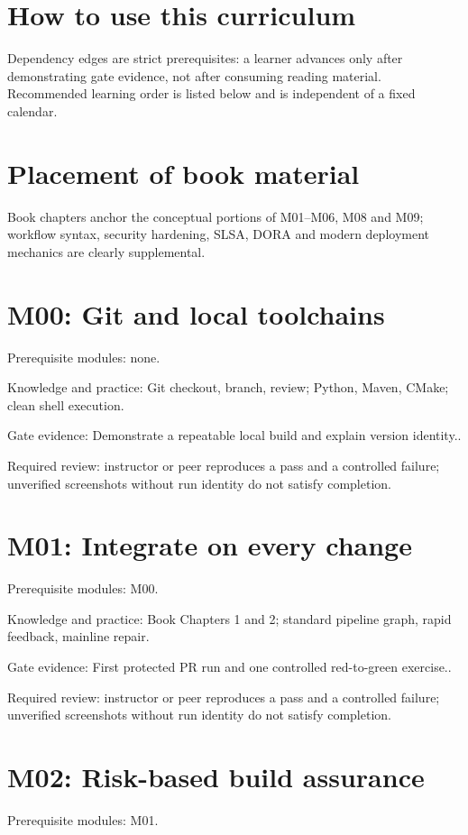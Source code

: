 \documentclass[11pt,letterpaper]{article}
\begin{document}
\makedoctitle
\makedocsummary
\tableofcontents
\clearpage
\section{How to use this curriculum}
Dependency edges are strict prerequisites: a learner advances only after demonstrating gate evidence, not after consuming reading material. Recommended learning order is listed below and is independent of a fixed calendar.

\section{Placement of book material}
Book chapters anchor the conceptual portions of M01--M06, M08 and M09; workflow syntax, security hardening, SLSA, DORA and modern deployment mechanics are clearly supplemental.

\section{M00: Git and local toolchains}
Prerequisite modules: none.

Knowledge and practice: Git checkout, branch, review; Python, Maven, CMake; clean shell execution.

Gate evidence: Demonstrate a repeatable local build and explain version identity..

Required review: instructor or peer reproduces a pass and a controlled failure; unverified screenshots without run identity do not satisfy completion.

\section{M01: Integrate on every change}
Prerequisite modules: M00.

Knowledge and practice: Book Chapters 1 and 2; standard pipeline graph, rapid feedback, mainline repair.

Gate evidence: First protected PR run and one controlled red-to-green exercise..

Required review: instructor or peer reproduces a pass and a controlled failure; unverified screenshots without run identity do not satisfy completion.

\section{M02: Risk-based build assurance}
Prerequisite modules: M01.
\end{document}
